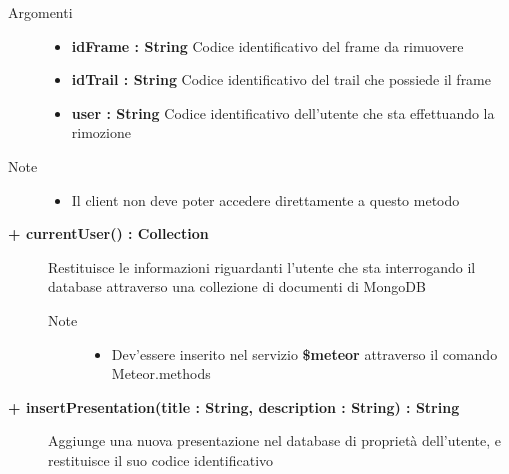 \begin{description}
\begin{description}
		\begin{description}
			\item[Argomenti] \hfill
				\begin{itemize}
				
					\item \textbf{idFrame : String			} \hfill
					Codice identificativo del frame da rimuovere
					\item \textbf{idTrail : String			} \hfill
					Codice identificativo del trail che possiede il frame
					\item \textbf{user : String			} \hfill
					Codice identificativo dell'utente che sta effettuando la rimozione
					
				\end{itemize}
			\item[Note] \hfill
			\begin{itemize}
					\item Il client non deve poter accedere direttamente a questo metodo
				\end{itemize}
		\end{description}
	\end{description}

	\begin{description}
		\item[\textbf{\color{blue}+ currentUser() : Collection			}] \hfill
			Restituisce le informazioni riguardanti l'utente che sta interrogando il database attraverso una collezione di documenti di MongoDB
			
		\begin{description}
			
			\item[Note] \hfill
			\begin{itemize}
					\item Dev'essere inserito nel servizio \textbf{\$meteor} attraverso il comando Meteor.methods
				\end{itemize}
		\end{description}
	\end{description}

	\begin{description}
		\item[\textbf{\color{blue}+ insertPresentation(title : String, description : String) : String			}] \hfill
			Aggiunge una nuova presentazione nel database di proprietà dell'utente, e restituisce il suo codice identificativo
			

\end{description}
\end{description}
